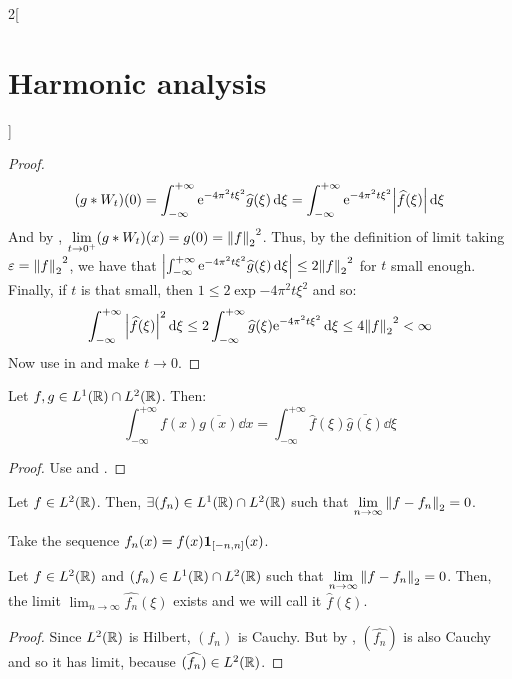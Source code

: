 \documentclass[../../../main_math.tex]{subfiles}
\begin{document}
\begin{multicols}{2}[\section{Harmonic analysis}]
\begin{proof}
    \begin{equation}\label{HA:planchEq}
      (g*W_t)(0)=\int_{-\infty}^{+\infty}\mathrm{e}^{-4\pi^2 t\xi^2}\widehat{g}(\xi)\dd{\xi}=\int_{-\infty}^{+\infty}\mathrm{e}^{-4\pi^2 t\xi^2}\abs{\widehat{f}(\xi)}\dd{\xi}
    \end{equation}
    And by , $\displaystyle\lim_{t\to 0^+}(g*W_t)(x)=g(0)={\left\|f\right\|_2}^2$. Thus, by the definition of limit taking $\varepsilon = {\left\|f\right\|_2}^2$, we have that $\abs{\int_{-\infty}^{+\infty}\mathrm{e}^{-4\pi^2 t\xi^2}\widehat{g}(\xi)\dd{\xi}}\leq 2{\left\|f\right\|_2}^2$ for $t$ small enough. Finally, if $t$ is that small, then $1\leq 2\exp{-4\pi^2 t\xi^2}$ and so:
    $$\int_{-\infty}^{+\infty}\abs{\widehat{f}(\xi)}^2\dd{\xi}\leq 2\int_{-\infty}^{+\infty}\widehat{g}(\xi)\mathrm{e}^{-4\pi^2 t\xi^2}\dd{\xi}\leq 4{\left\|f\right\|_2}^2<\infty$$
    Now use  in  and make $t\to 0$.
  \end{proof}
  \begin{corollary}
    Let $f,g\in L^1(\mathbb{R})\cap L^2(\mathbb{R})$. Then:
    $$\int_{-\infty}^{+\infty}f(x)\overline{g(x)}\dd{x}=\int_{-\infty}^{+\infty}\widehat{f}(\xi)\overline{\widehat{g}(\xi)}\dd{\xi}$$
  \end{corollary}
  \begin{proof}
    Use  and .
  \end{proof}
  \begin{proposition}\label{HA:preDefFTinL2}
    Let $f\in L^2(\mathbb{R})$. Then, $\exists(f_n)\in L^1(\mathbb{R})\cap L^2(\mathbb{R})$ such that $\displaystyle\lim_{n\to\infty}\left\|f-f_n\right\|_2=0$.
  \end{proposition}
  \begin{sproof}
    Take the sequence $f_n(x)=f(x)\boldsymbol{\mathrm{1}}_{[-n,n]}(x)$.
  \end{sproof}
  \begin{proposition}
    Let $f\in L^2(\mathbb{R})$ and $(f_n)\in L^1(\mathbb{R})\cap L^2(\mathbb{R})$ such that $\displaystyle\lim_{n\to\infty}\left\|f-f_n\right\|_2=0$. Then, the limit $\displaystyle\lim_{n\to\infty}\widehat{f_n}(\xi)$ exists and we will call it $\widehat{f}(\xi)$.
  \end{proposition}
  \begin{proof}
    Since $L^2(\mathbb{R})$ is Hilbert, $(f_n)$ is Cauchy. But by , $(\widehat{f_n})$ is also Cauchy and so it has limit, because $(\widehat{f_n})\in L^2(\mathbb{R})$.


\end{proof}
\end{multicols}
\end{document}
